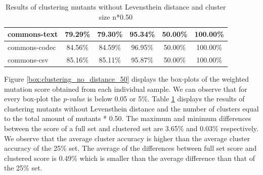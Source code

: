 \documentclass[conference,draftclsnofoot,onecolumn]{IEEEtran}
\begin{document}
\begin{table}[ht]
\begin{tabular}{|l|c|c|c|c|c|}
commons-text                  & 79.29\%                                                                                 & 79.30\%                                                                                     & 95.34\%                                                                              & 50.00\%                                                                               & 100.00\%                                                                             \\ \hline
commons-codec                 & 84.56\%                                                                                 & 84.59\%                                                                                     & 96.95\%                                                                              & 50.00\%                                                                               & 100.00\%                                                                             \\ \hline
commons-csv                   & 85.16\%                                                                                 & 85.11\%                                                                                     & 95.87\%                                                                              & 50.00\%                                                                               & 100.00\%                                                                             \\ \hline
\end{tabular}
\caption{\label{tab:clustering_no_distance_50}Results of clustering mutants without Levensthein distance and cluster size n*0.50}
\end{table}

Figure \ref{box:clustering_no_distance_50} displays the box-plots of the weighted mutation score obtained from each individual sample. 
We can observe that for every box-plot the \textit{p-value} is below 0.05 or 5\%.
Table \ref{tab:clustering_no_distance_50} displays the results of clustering mutants without Levensthein distance and the number of clusters equal to the total amount of mutants * 0.50.
The maximum and minimum differences between the score of a full set and clustered set are 3.65\% and 0.03\% respectively.
We observe that the average cluster accuracy is higher than the average cluster accuracy of the 25\% set. 
The average of the differences between full set score and clustered score is 0.49\% which is smaller than the average difference than that of the 25\% set.
\end{document}
